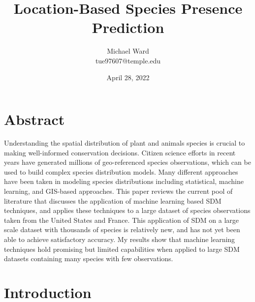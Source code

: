 \documentclass[12pt, oneside]{article}
\begin{document}
\title{Location-Based Species Presence Prediction}
\author{Michael Ward \\ tue97607@temple.edu}
\date{April 28, 2022}
\maketitle
\thispagestyle{empty}

\newpage
{}
\tableofcontents
\newpage
{}

\section{Abstract}
\label{Abstract}

\begin{normalsize}

Understanding the spatial distribution of plant and animals species is crucial to making well-informed conservation decisions. Citizen science efforts in recent years have generated millions of geo-referenced species observations, which can be used to build complex species distribution models. Many different approaches have been taken in modeling species distributions including statistical, machine learning, and GIS-based approaches. This paper reviews the current pool of literature that discusses the application of machine learning based SDM techniques, and applies these techniques to a large dataset of species observations taken from the United States and France. This application of SDM on a large scale dataset with thousands of species is relatively new, and has not yet been able to achieve satisfactory accuracy. My results show that machine learning techniques hold promising but limited capabilities when applied to large SDM datasets containing many species with few observations.

\end{normalsize}
\newpage

\section{Introduction}
\label{Introduction}
\end{document}
